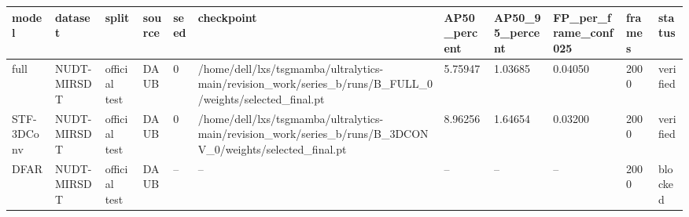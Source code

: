 \begin{tabular}{lllllllllll}
\hline
model & dataset & split & source & seed & checkpoint & AP50\_percent & AP50\_95\_percent & FP\_per\_frame\_conf025 & frames & status \\
\hline
full & NUDT-MIRSDT & official test & DAUB & 0 & /home/dell/lxs/tsgmamba/ultralytics-main/revision\_work/series\_b/runs/B\_FULL\_0/weights/selected\_final.pt & 5.75947 & 1.03685 & 0.04050 & 2000 & verified \\
STF-3DConv & NUDT-MIRSDT & official test & DAUB & 0 & /home/dell/lxs/tsgmamba/ultralytics-main/revision\_work/series\_b/runs/B\_3DCONV\_0/weights/selected\_final.pt & 8.96256 & 1.64654 & 0.03200 & 2000 & verified \\
DFAR & NUDT-MIRSDT & official test & DAUB & -- & -- & -- & -- & -- & 2000 & blocked \\
\hline
\end{tabular}
